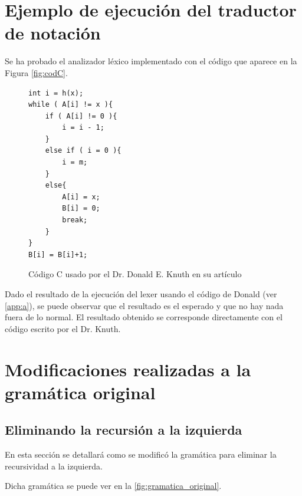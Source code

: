 \documentclass[a4paper,twocolumn]{article}
\begin{document}
    \section{Ejemplo de ejecución del traductor de notación}\label{sec:ejemplo-de-ejecucion-del-traductor-de-notacion}
    Se ha probado el analizador léxico implementado con el código que aparece en la Figura \autoref{fig:codC}.

    \begin{figure}
        \lstset{language=C}
        \begin{lstlisting}[label={lst:lstlisting}]
int i = h(x);
while ( A[i] != x ){
    if ( A[i] != 0 ){
        i = i - 1;
    }
    else if ( i = 0 ){
        i = m;
    }
    else{
        A[i] = x;
        B[i] = 0;
        break;
    }
}
B[i] = B[i]+1;
        \end{lstlisting}
        \caption{Código C usado por el Dr. Donald E. Knuth en su artículo\cite{donald}}
        \label{fig:codC}
    \end{figure}

    Dado el resultado de la ejecución del lexer usando el código de Donald (ver \autoref{app:a}), se puede observar que el resultado es el esperado y que no hay nada fuera de lo normal.
    El resultado obtenido se corresponde directamente con el código escrito por el Dr. Knuth.


    \section{Modificaciones realizadas a la gramática original}\label{sec:modificaciones-realizadas-a-la-gramatica-original}

    \subsection {Eliminando la recursión a la izquierda}\label{subsec:eliminando-la-recursion-a-la-izquierda}
    En esta sección se detallará como se modificó la gramática para eliminar la recursividad a la izquierda.

    Dicha gramática se puede ver en la \autoref{fig:gramatica_original}.
\end{document}
